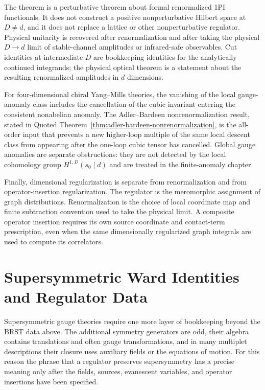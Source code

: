 The theorem is a perturbative theorem about formal renormalized 1PI
functionals.  It does not construct a positive
nonperturbative Hilbert space at \(D\neq d\), and it does not replace a
lattice or other nonperturbative regulator.  Physical unitarity is recovered
after renormalization and after taking the physical \(D\to d\) limit of
stable-channel amplitudes or infrared-safe observables.  Cut identities at
intermediate \(D\) are bookkeeping identities for the analytically continued
integrands; the physical optical theorem is a statement about the resulting
renormalized amplitudes in \(d\) dimensions.

For four-dimensional chiral Yang--Mills theories, the vanishing of the local
gauge-anomaly class includes the cancellation of the cubic invariant entering
the consistent nonabelian anomaly.  The Adler--Bardeen nonrenormalization
result, stated in
Quoted Theorem~\ref{thm:adler-bardeen-nonrenormalization}, is the all-order input
that prevents a new higher-loop multiple of the same local descent class from
appearing after the one-loop cubic tensor has cancelled.  Global gauge
anomalies are separate obstructions: they are not detected by the local
cohomology group \(H^{1,D}(s_0\mid d)\) and are treated in the finite-anomaly
chapter.

Finally, dimensional regularization is separate from renormalization and from
operator-insertion regularization.  The regulator is the meromorphic
assignment of graph distributions.  Renormalization is the choice of local
coordinate map and finite subtraction convention used to take the physical
limit.  A composite operator insertion requires its own source coordinate and
contact-term prescription, even when the same dimensionally regularized graph
integrals are used to compute its correlators.

\section{Supersymmetric Ward Identities and Regulator Data}
\label{sec:susy-regulator-data}

Supersymmetric gauge theories require one more layer of bookkeeping beyond the
BRST data above.  The additional symmetry generators are odd, their algebra
contains translations and often gauge transformations, and in many multiplet
descriptions their closure uses auxiliary fields or the equations of motion.
For this reason the phrase that a regulator preserves supersymmetry has a
precise meaning only after the fields, sources, evanescent variables, and
operator insertions have been specified.

